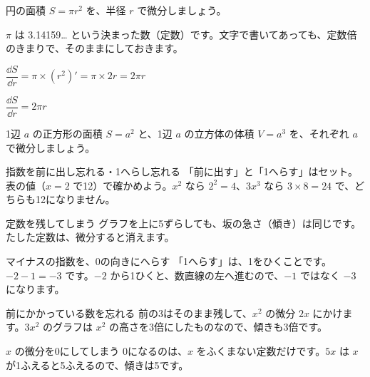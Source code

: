 \begin{reidai}[文字の定数をふくむ式]
円の面積 $S=\pi r^2$ を、半径 $r$ で微分しましょう。\par
\kangaekata $\pi$ は 3.14159… という決まった数（定数）です。文字で書いてあっても、定数倍のきまりで、そのままにしておきます。\par
\shiki $\dfrac{\dd S}{\dd r}=\pi\times(r^2)'=\pi\times2r=2\pi r$\par
\kotae $\dfrac{\dd S}{\dd r}=2\pi r$
\end{reidai}

\begin{jibun}
1辺 $a$ の正方形の面積 $S=a^2$ と、1辺 $a$ の立方体の体積 $V=a^3$ を、それぞれ $a$ で微分しましょう。
\end{jibun}


\begin{tsumazuki}{指数を前に出し忘れる・1へらし忘れる}
「前に出す」と「1へらす」はセット。表の値（$x=2$ で12）で確かめよう。$x^2$ なら $2^2=4$、$3x^3$ なら $3\times8=24$ で、どちらも12になりません。
\end{tsumazuki}

\begin{tsumazuki}{定数を残してしまう}
グラフを上に5ずらしても、坂の急さ（傾き）は同じです。たした定数は、微分すると消えます。
\end{tsumazuki}

\begin{tsumazuki}{マイナスの指数を、0の向きにへらす}
「1へらす」は、1をひくことです。$-2-1=-3$ です。$-2$ から1ひくと、数直線の左へ進むので、$-1$ ではなく $-3$ になります。
\end{tsumazuki}

\begin{tsumazuki}{前にかかっている数を忘れる}
前の3はそのまま残して、$x^2$ の微分 $2x$ にかけます。$3x^2$ のグラフは $x^2$ の高さを3倍にしたものなので、傾きも3倍です。
\end{tsumazuki}

\begin{tsumazuki}{$x$ の微分を0にしてしまう}
0になるのは、$x$ をふくまない定数だけです。$5x$ は $x$ が1ふえると5ふえるので、傾きは5です。
\end{tsumazuki}

